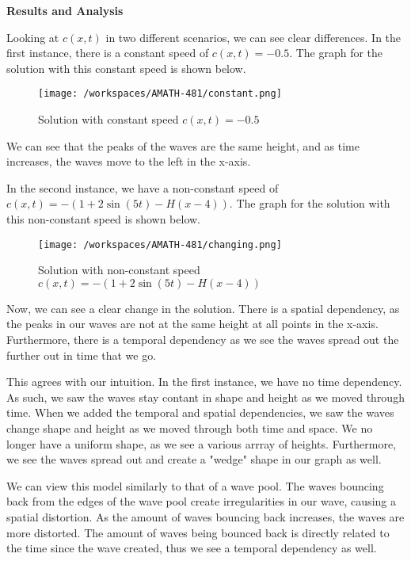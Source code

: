 \documentclass[a4paper,12pt, fleqn]{article}
\begin{document}
\begin{enumerate}
        \textbf{Results and Analysis}

        Looking at $c(x, t)$ in two different scenarios, we can see clear differences. 
        In the first instance, there is a constant speed of $c(x,t) = -0.5$. The graph for
        the solution with this constant speed is shown below.\\

        \begin{figure}[H]
            \centering
            \texttt{[image: /workspaces/AMATH-481/constant.png]}
            \caption{Solution with constant speed $c(x,t) = -0.5$}
            \label{fig:hw3-1a}
        \end{figure}

        We can see that the peaks of the waves are the same height, and as time increases, the
        waves move to the left in the x-axis. 

        In the second instance, we have a non-constant speed of 
        $c(x,t) = -\left(1 + 2\sin(5t) - H(x-4)\right)$. The graph for the solution with this
        non-constant speed is shown below.\\

        \begin{figure}[H]
            \centering
            \texttt{[image: /workspaces/AMATH-481/changing.png]}
            \caption{Solution with non-constant speed $c(x,t) = -\left(1 + 2\sin(5t) - H(x-4)\right)$}
            \label{fig:hw3-1b}
        \end{figure}

        Now, we can see a clear change in the solution. There is a spatial dependency, as the 
        peaks in our waves are not at the same height at all points in the x-axis. Furthermore, 
        there is a temporal dependency as we see the waves spread out the further out in time that 
        we go. 

        This agrees with our intuition. In the first instance, we have no time dependency. As such, 
        we saw the waves stay contant in shape and height as we moved through time. When we added the
        temporal and spatial dependencies, we saw the waves change shape and height as we moved through
        both time and space. We no longer have a uniform shape, as we see a various arrray of heights. 
        Furthermore, we see the waves spread out and create a "wedge" shape in our graph as well. 

        We can view this model similarly to that of a wave pool. The waves bouncing back from the edges
        of the wave pool create irregularities in our wave, causing a spatial distortion. As the amount of waves 
        bouncing back increases, the waves are more distorted. The amount of waves being bounced back is directly 
        related to the time since the wave created, thus we see a temporal dependency as well. 


\end{enumerate}
\end{document}
